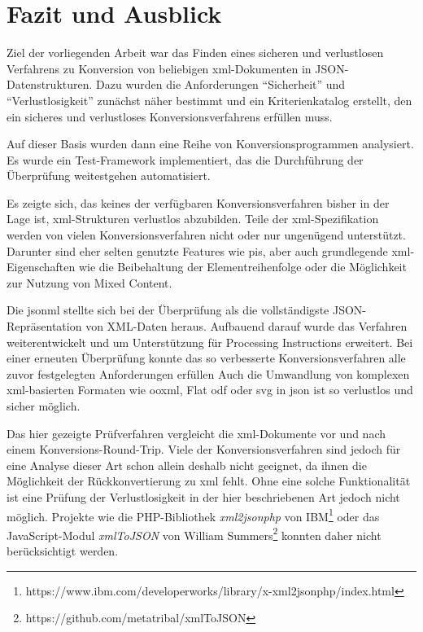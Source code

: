 \chapter{Fazit und Ausblick} \label{chap:conclusion}
Ziel der vorliegenden Arbeit war das Finden eines sicheren und verlustlosen Verfahrens zu Konversion von beliebigen \acrshort{xml}-Dokumenten in JSON-Datenstrukturen. Dazu wurden die Anforderungen \enquote{Sicherheit} und \enquote{Verlustlosigkeit} zunächst näher bestimmt und ein Kriterienkatalog erstellt, den ein sicheres und verlustloses Konversionsverfahrens erfüllen muss.

Auf dieser Basis wurden dann eine Reihe von Konversionsprogrammen analysiert. Es wurde ein Test-Framework implementiert, das die Durchführung der Überprüfung weitestgehen automatisiert.

Es zeigte sich, das keines der verfügbaren Konversionsverfahren bisher in der Lage ist, \acrshort{xml}-Strukturen verlustlos abzubilden. Teile der \acrshort{xml}-Spezifikation werden von vielen Konversionsverfahren nicht oder nur ungenügend unterstützt. Darunter sind eher selten genutzte Features wie \glspl{pi}, aber auch grundlegende \acrshort{xml}-Eigenschaften wie die Beibehaltung der Elementreihenfolge oder die Möglichkeit zur Nutzung von Mixed Content.

Die \acrfull{jsonml} stellte sich bei der Überprüfung als die vollständigste JSON-Repräsentation von XML-Daten heraus. Aufbauend darauf wurde das Verfahren weiterentwickelt und um Unterstützung für Processing Instructions erweitert.
Bei einer erneuten Überprüfung konnte das so verbesserte Konversionsverfahren alle zuvor festgelegten Anforderungen erfüllen Auch die Umwandlung von komplexen \acrshort{xml}-basierten Formaten wie \gls{ooxml}, Flat \gls{odf} oder \gls{svg} in \acrshort{json} ist so verlustlos und sicher möglich.

Das hier gezeigte Prüfverfahren vergleicht die \acrshort{xml}-Dokumente vor und nach einem Konversions-Round-Trip. Viele der Konversionsverfahren sind jedoch für eine Analyse dieser Art schon allein deshalb nicht geeignet, da ihnen die Möglichkeit der Rückkonvertierung zu \acrshort{xml} fehlt. Ohne eine solche Funktionalität ist eine Prüfung der Verlustlosigkeit in der hier beschriebenen Art jedoch nicht möglich. Projekte wie die PHP-Bibliothek \emph{xml2jsonphp} von IBM\footnote{https://www.ibm.com/developerworks/library/x-xml2jsonphp/index.html} oder das JavaScript-Modul \emph{xmlToJSON} von William Summers\footnote{https://github.com/metatribal/xmlToJSON} konnten daher nicht berücksichtigt werden.

